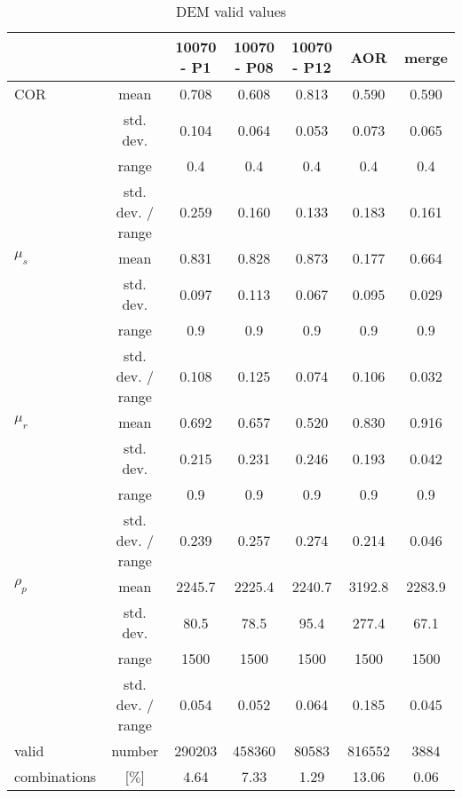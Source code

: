 \begin{table}[h]
\centering
\begin{tabular}{|l|c|c|c|c|c|c|}
\hline

          &       & 10070 - P1 & 10070 - P08 & 10070 - P12 & AOR   & merge \\
          \hline
    COR   & mean  & 0.708 & 0.608 & 0.813 & 0.590 & 0.590 \\
          & std. dev. & 0.104 & 0.064 & 0.053 & 0.073 & 0.065 \\
          & range & 0.4   & 0.4   & 0.4   & 0.4   & 0.4 \\
          & std. dev. / range & 0.259 & 0.160 & 0.133 & 0.183 & 0.161 \\
          \hline
    $\mu_s$ & mean  & 0.831 & 0.828 & 0.873 & 0.177 & 0.664 \\
          & std. dev. & 0.097 & 0.113 & 0.067 & 0.095 & 0.029 \\
          & range & 0.9   & 0.9   & 0.9   & 0.9   & 0.9 \\
          & std. dev. / range & 0.108 & 0.125 & 0.074 & 0.106 & 0.032 \\
          \hline
    $\mu_r$ & mean  & 0.692 & 0.657 & 0.520 & 0.830 & 0.916 \\
          & std. dev. & 0.215 & 0.231 & 0.246 & 0.193 & 0.042 \\
          & range & 0.9   & 0.9   & 0.9   & 0.9   & 0.9 \\
          & std. dev. / range & 0.239 & 0.257 & 0.274 & 0.214 & 0.046 \\
          \hline
    $\rho_p$ & mean  & 2245.7 & 2225.4 & 2240.7 & 3192.8 & 2283.9 \\
          & std. dev. & 80.5  & 78.5  & 95.4  & 277.4 & 67.1 \\
          & range & 1500  & 1500  & 1500  & 1500  & 1500 \\
          & std. dev. / range & 0.054 & 0.052 & 0.064 & 0.185 & 0.045 \\
          \hline
    valid & number & 290203 & 458360 & 80583 & 816552 & 3884 \\
    combinations & [$\%$] & 4.64  & 7.33  & 1.29  & 13.06 & 0.06 \\

    

\hline
\end{tabular}
\caption{DEM valid values}
\label{tab:13DEMvalidvalues}
\end{table}
